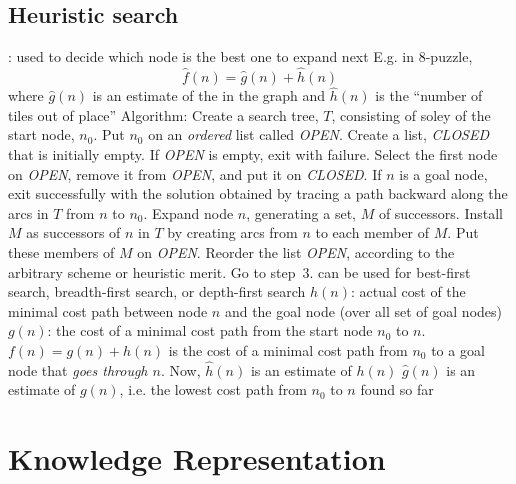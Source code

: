 \documentclass{note}
\begin{document}
\subsection{Heuristic search}
\bit
\w {}: used to decide
	which node is the best one to expand next
	\bit
	\w E.g. in 8-puzzle, 
		\[ \hat{f}(n) = \hat{g}(n) + \hat{h}(n) \]
	where $\hat{g}(n)$ is an estimate of the  in the graph
	and $\hat{h}(n)$ is the ``number of tiles out of place''
	\eit
\w {}
	\bit
	\w Algorithm:
		\ben
		\w Create a search tree, $T$, consisting of soley of the 
			start node, $n_0$. Put $n_0$ on an {\em ordered\/}
			list called {\sl OPEN\/}.
		\w Create a list, {\sl CLOSED\/} that is initially empty.
		\w If {\sl OPEN\/} is empty, exit with failure.
		\w Select the first node on {\sl OPEN\/}, remove it from
			{\sl OPEN\/}, and put it on {\sl CLOSED\/}.
		\w If $n$ is a goal node, exit successfully with
			the solution obtained by tracing a path 
			backward along the arcs in $T$ from $n$ to $n_0$.
		\w Expand node $n$, generating a set, $M$ of successors.
			Install $M$ as successors of $n$ in $T$ by creating
			arcs from $n$ to each member of $M$. Put these
			members of $M$ on {\sl OPEN\/}.
		\w Reorder the list {\sl OPEN\/}, according to the
			arbitrary scheme or heuristic merit.
		\w Go to step~3.
		\een
	\w can be used for best-first search, breadth-first search, or
		depth-first search
	\eit
\w {}
	\bit
	\w $h(n)$: actual cost of the minimal cost path between node $n$ 
		and the goal node (over all set of goal nodes)
	\w $g(n)$: the cost of a minimal cost path from the start node $n_0$
		to $n$.
	\w $f(n) = g(n) + h(n)$ is the cost of a minimal cost path
		from $n_0$ to a goal node that {\em goes through $n$\/}.
	\w Now, 
		\bit
		\w $\hat{h}(n)$ is an estimate of $h(n)$
		\w $\hat{g}(n)$ is an estimate of $g(n)$, i.e. the lowest
			cost path from $n_0$ to $n$ found so far
		\eit
	\eit
\w {}
\eit

\section{Knowledge Representation}
\end{document}
